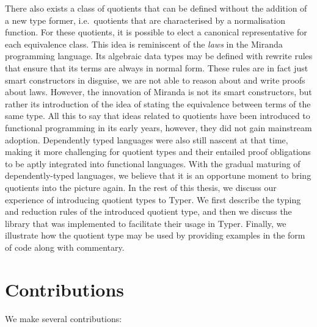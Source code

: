 \documentclass[12pt,twoside,maitrise]{dms}
\theoremstyle{definition}
\numberwithin{equation}{section}
\numberwithin{table}{chapter}
\numberwithin{figure}{chapter}
\begin{document}
There also exists a class of quotients that can be defined without the addition
of a new type former, i.e.\ quotients that are characterised by a normalisation
function\cite{li2015quotient,courtieu-normalizedtypes}. For these quotients, it
is possible to elect a canonical representative for each equivalence class. This
idea is reminiscent of the \emph{laws} in the Miranda programming
language\cite{thompson1986laws}. Its algebraic data types may be defined with
rewrite rules that ensure that its terms are always in normal form. These rules
are in fact just smart constructors in disguise, we are not able to reason about
and write proofs about laws. However, the innovation of Miranda is not its smart
constructors, but rather its introduction of the idea of stating the equivalence
between terms of the same type. All this to say that ideas related to quotients
have been introduced to functional programming in its early years, however, they
did not gain mainstream adoption. Dependently typed languages were also still
nascent at that time, making it more challenging for quotient types and their
entailed proof obligations to be aptly integrated into functional languages.
With the gradual maturing of dependently-typed languages, we believe that it is
an opportune moment to bring quotients into the picture again. In the rest of
this thesis, we discuss our experience of introducing quotient types to Typer.
We first describe the typing and reduction rules of the introduced quotient
type, and then we discuss the library that was implemented to facilitate their
usage in Typer. Finally, we illustrate how the quotient type may be used by
providing examples in the form of code along with commentary.

\section{Contributions}

We make several contributions:
\end{document}
